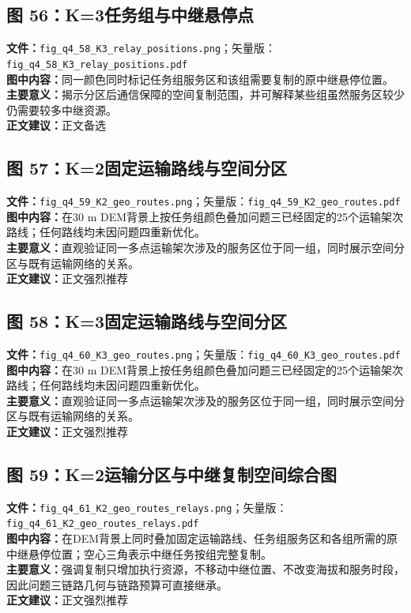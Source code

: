 \subsection*{图 56：K=3任务组与中继悬停点}
\textbf{文件：}\texttt{fig\_q4\_58\_K3\_relay\_positions.png}；矢量版：\texttt{fig\_q4\_58\_K3\_relay\_positions.pdf}\\
\textbf{图中内容：}同一颜色同时标记任务组服务区和该组需要复制的原中继悬停位置。\\
\textbf{主要意义：}揭示分区后通信保障的空间复制范围，并可解释某些组虽然服务区较少仍需要较多中继资源。\\
\textbf{正文建议：}正文备选

\subsection*{图 57：K=2固定运输路线与空间分区}
\textbf{文件：}\texttt{fig\_q4\_59\_K2\_geo\_routes.png}；矢量版：\texttt{fig\_q4\_59\_K2\_geo\_routes.pdf}\\
\textbf{图中内容：}在30 m DEM背景上按任务组颜色叠加问题三已经固定的25个运输架次路线；任何路线均未因问题四重新优化。\\
\textbf{主要意义：}直观验证同一多点运输架次涉及的服务区位于同一组，同时展示空间分区与既有运输网络的关系。\\
\textbf{正文建议：}正文强烈推荐

\subsection*{图 58：K=3固定运输路线与空间分区}
\textbf{文件：}\texttt{fig\_q4\_60\_K3\_geo\_routes.png}；矢量版：\texttt{fig\_q4\_60\_K3\_geo\_routes.pdf}\\
\textbf{图中内容：}在30 m DEM背景上按任务组颜色叠加问题三已经固定的25个运输架次路线；任何路线均未因问题四重新优化。\\
\textbf{主要意义：}直观验证同一多点运输架次涉及的服务区位于同一组，同时展示空间分区与既有运输网络的关系。\\
\textbf{正文建议：}正文强烈推荐

\subsection*{图 59：K=2运输分区与中继复制空间综合图}
\textbf{文件：}\texttt{fig\_q4\_61\_K2\_geo\_routes\_relays.png}；矢量版：\texttt{fig\_q4\_61\_K2\_geo\_routes\_relays.pdf}\\
\textbf{图中内容：}在DEM背景上同时叠加固定运输路线、任务组服务区和各组所需的原中继悬停位置；空心三角表示中继任务按组完整复制。\\
\textbf{主要意义：}强调复制只增加执行资源，不移动中继位置、不改变海拔和服务时段，因此问题三链路几何与链路预算可直接继承。\\
\textbf{正文建议：}正文强烈推荐

